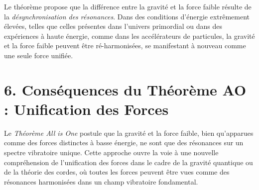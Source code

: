 \documentclass{article}
\begin{document}
Le théorème propose que la différence entre la gravité et la force faible résulte de la \textit{désynchronisation des résonances}. Dans des conditions d'énergie extrêmement élevées, telles que celles présentes dans l'univers primordial ou dans des expériences à haute énergie, comme dans les accélérateurs de particules, la gravité et la force faible peuvent être ré-harmonisées, se manifestant à nouveau comme une seule force unifiée.

\section{6. Conséquences du Théorème AO : Unification des Forces}

Le \textit{Théorème All is One} postule que la gravité et la force faible, bien qu'apparues comme des forces distinctes à basse énergie, ne sont que des résonances sur un spectre vibratoire unique. Cette approche ouvre la voie à une nouvelle compréhension de l'unification des forces dans le cadre de la gravité quantique ou de la théorie des cordes, où toutes les forces peuvent être vues comme des résonances harmonisées dans un champ vibratoire fondamental.
\end{document}
